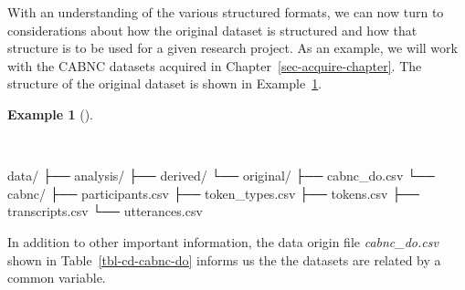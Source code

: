 \documentclass[
  letterpaper,
]{latex/krantz}
\newenvironment{Shaded}{\begin{snugshade}}{\end{snugshade}}
\newcommand{\ExtensionTok}[1]{\textcolor[rgb]{0.00,0.00,0.00}{#1}}
\newcommand{\NormalTok}[1]{\textcolor[rgb]{0.00,0.00,0.00}{#1}}
\theoremstyle{definition}
\newtheorem{example}{Example}[chapter]
\theoremstyle{remark}
\begin{document}
With an understanding of the various structured formats, we can now turn
to considerations about how the original dataset is structured and how
that structure is to be used for a given research project. As an
example, we will work with the CABNC datasets acquired in
Chapter~\ref{sec-acquire-chapter}. The structure of the original dataset
is shown in Example~\ref{exm-cd-cabnc-structure}.

\begin{example}[]\protect\hypertarget{exm-cd-cabnc-structure}{}\label{exm-cd-cabnc-structure}

~

\begin{Shaded}
\begin{Highlighting}[]
\ExtensionTok{data/}
\ExtensionTok{├──}\NormalTok{ analysis/}
\ExtensionTok{├──}\NormalTok{ derived/}
\ExtensionTok{└──}\NormalTok{ original/}
    \ExtensionTok{├──}\NormalTok{ cabnc\_do.csv}
    \ExtensionTok{└──}\NormalTok{ cabnc/}
        \ExtensionTok{├──}\NormalTok{ participants.csv}
        \ExtensionTok{├──}\NormalTok{ token\_types.csv}
        \ExtensionTok{├──}\NormalTok{ tokens.csv}
        \ExtensionTok{├──}\NormalTok{ transcripts.csv}
        \ExtensionTok{└──}\NormalTok{ utterances.csv}
\end{Highlighting}
\end{Shaded}

\end{example}

In addition to other important information, the data origin file
\emph{cabnc\_do.csv} shown in Table~\ref{tbl-cd-cabnc-do} informs us the
the datasets are related by a common variable.
\end{document}
